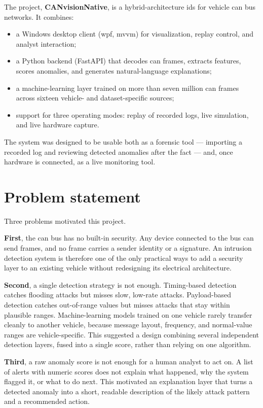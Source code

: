 The project, \textbf{CANvisionNative}, is a hybrid-architecture \gls{ids} for vehicle \gls{can} bus networks. It combines:

\begin{itemize}
    \item a Windows desktop client (\gls{wpf}, \gls{mvvm}) for visualization, replay control, and analyst interaction;
    \item a Python backend (FastAPI) that decodes \gls{can} frames, extracts features, scores anomalies, and generates natural-language explanations;
    \item a machine-learning layer trained on more than seven million \gls{can} frames across sixteen vehicle- and dataset-specific sources;
    \item support for three operating modes: replay of recorded logs, live simulation, and live hardware capture.
\end{itemize}

The system was designed to be usable both as a forensic tool — importing a recorded log and reviewing detected anomalies after the fact — and, once hardware is connected, as a live monitoring tool.

\section{Problem statement}

Three problems motivated this project.

\textbf{First}, the \gls{can} bus has no built-in security. Any device connected to the bus can send frames, and no frame carries a sender identity or a signature. An intrusion detection system is therefore one of the only practical ways to add a security layer to an existing vehicle without redesigning its electrical architecture.

\textbf{Second}, a single detection strategy is not enough. Timing-based detection catches flooding attacks but misses slow, low-rate attacks. Payload-based detection catches out-of-range values but misses attacks that stay within plausible ranges. Machine-learning models trained on one vehicle rarely transfer cleanly to another vehicle, because message layout, frequency, and normal-value ranges are vehicle-specific. This suggested a design combining several independent detection layers, fused into a single score, rather than relying on one algorithm.

\textbf{Third}, a raw anomaly score is not enough for a human analyst to act on. A list of alerts with numeric scores does not explain what happened, why the system flagged it, or what to do next. This motivated an explanation layer that turns a detected anomaly into a short, readable description of the likely attack pattern and a recommended action.


